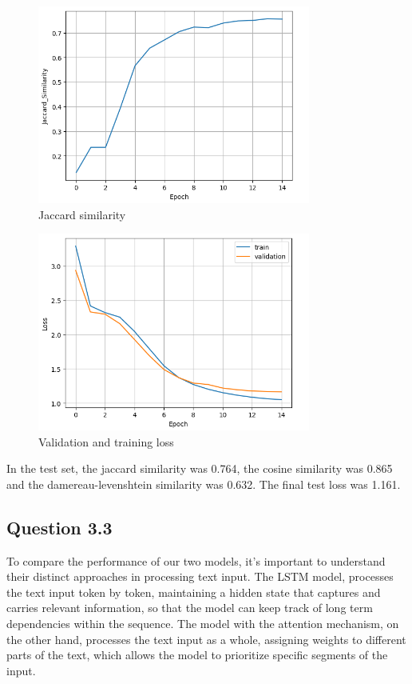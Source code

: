 \documentclass{article}
\begin{document}
\begin{figure}[H]
    \centering
    \includegraphics[width=0.8\textwidth]{../report/plots/Transformer-jaccard-similarity.png}
    \caption{Jaccard similarity}
    \label{fig:transformer-jaccard-similarity}
\end{figure}

\begin{figure}[H]
    \centering
    \includegraphics[width=0.8\textwidth]{../report/plots/Transformer-valid-train-loss.png}
    \caption{Validation and training loss}
    \label{fig:transformer-valid-train-loss}
\end{figure}


In the test set, the jaccard similarity was 0.764, the cosine similarity was 0.865 and the damereau-levenshtein similarity was 0.632. The final test loss was 1.161.

\subsection{Question 3.3}
To compare the performance of our two models, it's important to understand
their distinct approaches in processing text input. The LSTM model, processes the text input
token by token, maintaining a hidden state that captures and carries relevant 
information, so that the model can keep track of long term dependencies within
the sequence. The model with the attention mechanism, on the other hand, processes 
the text input as a whole, assigning weights to different parts of the text, 
which allows the model to prioritize specific segments of the input.
\end{document}
